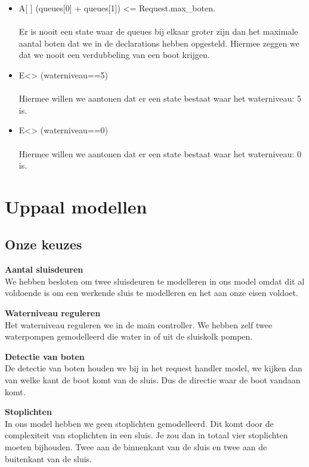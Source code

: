 \documentclass[oneside]{scrbook}
\begin{document}
\begin{itemize}
    \item A[ ] (queues[0] + queues[1]) <= Request.max\_boten.\\
    \\ Er is nooit een state waar de queues bij elkaar groter zijn dan het maximale aantal boten dat we in de declarations hebben opgesteld. Hiermee zeggen we dat we nooit een verdubbeling van een boot krijgen.
    
    \item E<> (waterniveau==5) \\
    \\ Hiermee willen we aantonen dat er een state bestaat waar het waterniveau: 5 is.
    
     \item E<> (waterniveau==0) \\
    \\ Hiermee willen we aantonen dat er een state bestaat waar het waterniveau: 0 is.
\end{itemize}


\chapter{Uppaal modellen}

\section{Onze keuzes}

\textbf{Aantal sluisdeuren} \\
We hebben besloten om twee sluisdeuren te modelleren in ons model omdat dit al voldoende is om een werkende sluis te modelleren en het aan onze eisen voldoet.  

\textbf{Waterniveau reguleren} \\
Het waterniveau reguleren we in de main controller. We hebben zelf twee waterpompen gemodelleerd die water in of uit de sluiskolk pompen.  

\textbf{Detectie van boten} \\
De detectie van boten houden we bij in het request handler model, we kijken dan van welke kant de boot komt van de sluis. Dus de directie waar de boot vandaan komt.

\textbf{Stoplichten} \\
In ons model hebben we geen stoplichten gemodelleerd. Dit komt door de complexiteit van stoplichten in een sluis. Je zou dan in totaal vier stoplichten moeten bijhouden. Twee aan de binnenkant van de sluis en twee aan de buitenkant van de sluis.
\end{document}
